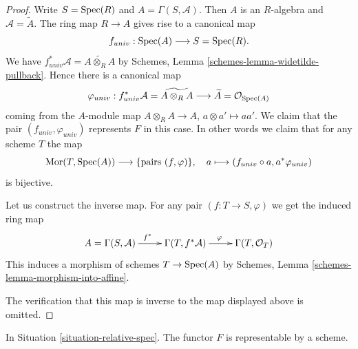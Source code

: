 \begin{proof}
Write $S = \mathop{\mathrm{Spec}}(R)$ and $A = \Gamma(S, \mathcal{A})$.
Then $A$ is an $R$-algebra and $\mathcal{A} = \widetilde A$.
The ring map $R \to A$ gives rise to a canonical map
$$
f_{univ} : \mathop{\mathrm{Spec}}(A)
\longrightarrow
S = \mathop{\mathrm{Spec}}(R).
$$
We have
$f_{univ}^*\mathcal{A} =  \widetilde{A \otimes_R A}$
by Schemes, Lemma \ref{schemes-lemma-widetilde-pullback}.
Hence there is a canonical map
$$
\varphi_{univ} :
f_{univ}^*\mathcal{A} = \widetilde{A \otimes_R A}
\longrightarrow
\widetilde A = \mathcal{O}_{\mathop{\mathrm{Spec}}(A)}
$$
coming from the $A$-module map $A \otimes_R A \to A$,
$a \otimes a' \mapsto aa'$. We claim that the pair
$(f_{univ}, \varphi_{univ})$ represents $F$ in this case.
In other words we claim that for any scheme $T$ the map
$$
\mathop{\mathrm{Mor}}\nolimits(T, \mathop{\mathrm{Spec}}(A)) \longrightarrow \{\text{pairs } (f, \varphi)\},\quad
a \longmapsto (f_{univ} \circ a, a^*\varphi_{univ})
$$
is bijective.

\medskip\noindent
Let us construct the inverse map.
For any pair $(f : T \to S, \varphi)$ we get the induced
ring map
$$
\xymatrix{
A = \Gamma(S, \mathcal{A}) \ar[r]^{f^*} &
\Gamma(T, f^*\mathcal{A}) \ar[r]^{\varphi} &
\Gamma(T, \mathcal{O}_T)
}
$$
This induces a morphism of schemes $T \to \mathop{\mathrm{Spec}}(A)$
by Schemes, Lemma \ref{schemes-lemma-morphism-into-affine}.

\medskip\noindent
The verification that this map is inverse to the map
displayed above is omitted.
\end{proof}

\begin{lemma}
\label{lemma-spec}
In Situation \ref{situation-relative-spec}.
The functor $F$ is representable by a scheme.
\end{lemma}

